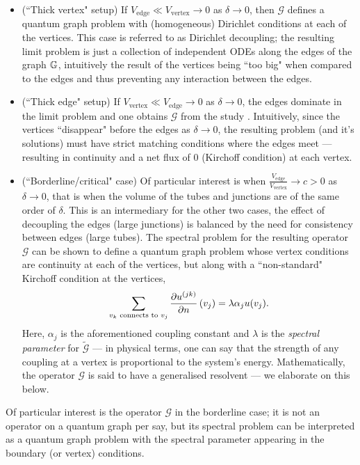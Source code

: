 \begin{itemize}
	\item (``Thick vertex" setup) If $V_{\mathrm{edge}}\ll V_{\mathrm{vertex}}\rightarrow0$ as $\delta\rightarrow0$, then $\mathcal{G}$ defines a quantum graph problem with (homogeneous) Dirichlet conditions at each of the vertices.
	This case is referred to as Dirichlet decoupling; the resulting limit problem is just a collection of independent ODEs along the edges of the graph $\mathbb{G}$, intuitively the result of the vertices being ``too big" when compared to the edges and thus preventing any interaction between the edges.
	\item (``Thick edge" setup) If $V_{\mathrm{vertex}}\ll V_{\mathrm{edge}}\rightarrow0$ as $\delta\rightarrow0$, the edges dominate in the limit problem and one obtains $\mathcal{G}$ from the study \cite{kuchment2001convergence}.
	Intuitively, since the vertices ``disappear" before the edges as $\delta\rightarrow0$, the resulting problem (and it's solutions) must have strict matching conditions where the edges meet --- resulting in continuity and a net flux of 0 (Kirchoff condition) at each vertex.
	\item (``Borderline/critical" case) Of particular interest is when $\frac{V_{\mathrm{edge}}}{V_{\mathrm{vertex}}}\rightarrow c>0$ as $\delta\rightarrow0$, that is when the volume of the tubes and junctions are of the same order of $\delta$.
	This is an intermediary for the other two cases, the effect of decoupling the edges (large junctions) is balanced by the need for consistency between edges (large tubes).
	The spectral problem for the resulting operator $\mathcal{G}$ can be shown to define a quantum graph problem whose vertex conditions are continuity at each of the vertices, but along with a ``non-standard" Kirchoff condition at the vertices,
	\begin{align*}
	\sum_{v_k \text{ connects to } v_j} 
	\dfrac{\partial u^{(jk)}}{\partial n}\left( v_j \right) = \lambda\alpha_j u(v_j).
	\end{align*}
	Here, $\alpha_j$ is the aforementioned coupling constant and $\lambda$ is the \emph{spectral parameter} for $\tilde{\mathcal{G}}$ --- in physical terms, one can say that the strength of any coupling at a vertex is proportional to the system's energy.
	Mathematically, the operator $\mathcal{G}$ is said to have a generalised resolvent --- we elaborate on this below.
\end{itemize}
Of particular interest is the operator $\mathcal{G}$ in the borderline case; it is not an operator on a quantum graph per say, but its spectral problem can be interpreted as a quantum graph problem with the spectral parameter appearing in the boundary (or vertex) conditions.
